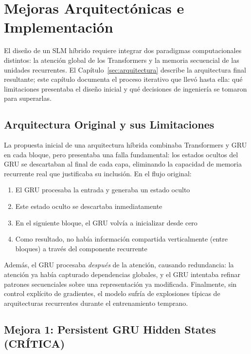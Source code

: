 \section[Mejoras del Modelo Híbrido]{Mejoras Arquitectónicas e Implementación}
\label{sec:implementation}

El diseño de un SLM híbrido requiere integrar dos paradigmas computacionales distintos: la atención global de los Transformers y la memoria secuencial de las unidades recurrentes. El Capítulo~\ref{sec:arquitectura} describe la arquitectura final resultante; este capítulo documenta el proceso iterativo que llevó hasta ella: qué limitaciones presentaba el diseño inicial y qué decisiones de ingeniería se tomaron para superarlas.

\subsection{Arquitectura Original y sus Limitaciones}

La propuesta inicial de una arquitectura híbrida combinaba Transformers y GRU en cada bloque, pero presentaba una falla fundamental: los estados ocultos del GRU se descartaban al final de cada capa, eliminando la capacidad de memoria recurrente real que justificaba su inclusión. En el flujo original:

\begin{enumerate}
    \item El GRU procesaba la entrada y generaba un estado oculto
    \item Este estado oculto se descartaba inmediatamente
    \item En el siguiente bloque, el GRU volvía a inicializar desde cero
    \item Como resultado, no había información compartida verticalmente (entre bloques) a través del componente recurrente
\end{enumerate}

Además, el GRU procesaba \textit{después} de la atención, causando redundancia: la atención ya había capturado dependencias globales, y el GRU intentaba refinar patrones secuenciales sobre una representación ya modificada. Finalmente, sin control explícito de gradientes, el modelo sufría de explosiones típicas de arquitecturas recurrentes durante el entrenamiento temprano.

\subsection{Mejora 1: Persistent GRU Hidden States (CRÍTICA)}

